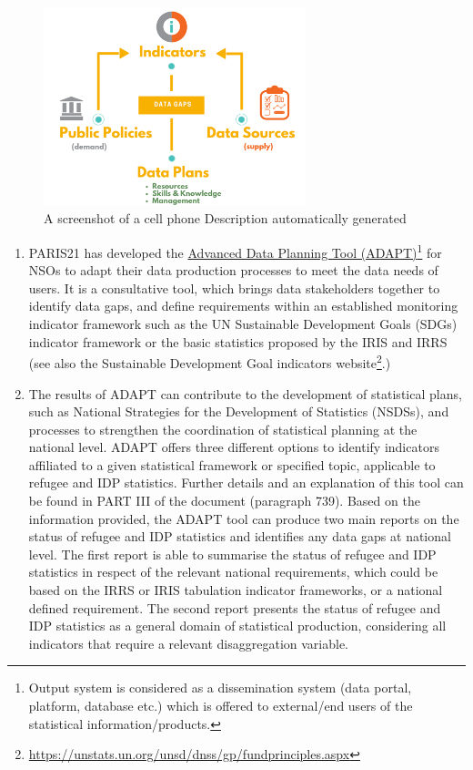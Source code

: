 \documentclass[
]{article}
\begin{document}
\begin{figure}
\centering
\includegraphics[width=3.0115in,height=2.26923in]{media/image2.png}
\caption{A screenshot of a cell phone Description automatically
generated}
\end{figure}

\begin{enumerate}
\def\labelenumi{\arabic{enumi}.}
\setcounter{enumi}{28}
\item
  PARIS21 has developed the \href{https://adapt.paris21.org/auth/login}{Advanced Data Planning Tool
  (ADAPT)}\footnote{Output system is considered as a dissemination system (data
    portal, platform, database etc.) which is offered to external/end
    users of the statistical information/products.} for NSOs to adapt
  their data production processes to meet the data needs of users. It
  is a consultative tool, which brings data stakeholders together to
  identify data gaps, and define requirements within an established
  monitoring indicator framework such as the UN Sustainable
  Development Goals (SDGs) indicator framework or the basic statistics
  proposed by the IRIS and IRRS (see also the Sustainable Development
  Goal indicators website\footnote{\url{https://unstats.un.org/unsd/dnss/gp/fundprinciples.aspx}}.)
\item
  The results of ADAPT can contribute to the development of
  statistical plans, such as National Strategies for the Development
  of Statistics (NSDSs), and processes to strengthen the coordination
  of statistical planning at the national level. ADAPT offers three
  different options to identify indicators affiliated to a given
  statistical framework or specified topic, applicable to refugee and
  IDP statistics. Further details and an explanation of this tool can
  be found in PART III of the document (paragraph 739). Based on the
  information provided, the ADAPT tool can produce two main reports on
  the status of refugee and IDP statistics and identifies any data
  gaps at national level. The first report is able to summarise the
  status of refugee and IDP statistics in respect of the relevant
  national requirements, which could be based on the IRRS or IRIS
  tabulation indicator frameworks, or a national defined requirement.
  The second report presents the status of refugee and IDP statistics
  as a general domain of statistical production, considering all
  indicators that require a relevant disaggregation variable.
\end{enumerate}
\end{document}
